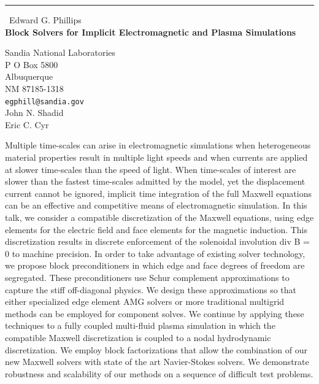 \documentclass{report}
\begin{document}
\begin{center}
\rule{6in}{1pt} \
{\large Edward G. Phillips \\
{\bf Block Solvers for Implicit Electromagnetic and Plasma Simulations}}

Sandia National Laboratories \\ P O Box 5800 \\ Albuquerque \\ NM 87185-1318
\\
{\tt egphill@sandia.gov}\\
John N. Shadid\\
Eric C. Cyr\end{center}

Multiple time-scales can arise in electromagnetic simulations when
heterogeneous material properties result in multiple light speeds and
when currents are applied at slower time-scales than the speed of light.
When time-scales of interest are slower than the fastest time-scales
admitted by the model, yet the displacement current cannot be ignored,
implicit time integration of the full Maxwell equations can be an
effective and competitive means of electromagnetic simulation. In this
talk, we consider a compatible discretization of the Maxwell equations,
using edge elements for the electric field and face elements for the
magnetic induction. This discretization results in discrete enforcement
of the solenoidal involution div B = 0 to machine precision. In order to
take advantage of existing solver technology, we propose block
preconditioners in which edge and face degrees of freedom are segregated.
These preconditioners use Schur complement approximations to capture the
stiff off-diagonal physics. We design these approximations so that either
specialized edge element AMG solvers or more traditional multigrid
methods can be employed for component solves. We continue by applying
these techniques to a fully coupled multi-fluid plasma simulation in
which the compatible Maxwell discretization is coupled to a nodal
hydrodynamic discretization. We employ block factorizations that allow
the combination of our new Maxwell solvers with state of the art
Navier-Stokes solvers. We demonstrate robustness and scalability of our
methods on a sequence of difficult test problems.
\end{document}
